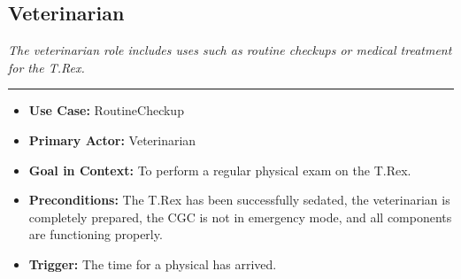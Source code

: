 \documentclass[12pt]{article}
\begin{document}
    \subsection{Veterinarian}
    \textit{The veterinarian role includes uses such as routine checkups or medical treatment for the T.Rex.}
    \par\noindent\rule{\textwidth}{0.4pt}    
    \begin{itemize}
        \item[]\textbf{Use Case:}                                
            RoutineCheckup

        \item[]\textbf{Primary Actor:}
            Veterinarian

        \item[]\textbf{Goal in Context:}
            To perform a regular physical exam on the T.Rex.

        \item[]\textbf{Preconditions:}
            The T.Rex has been successfully sedated, the veterinarian is completely prepared, 
            the CGC is not in emergency mode, and all components are functioning properly.

        \item[]\textbf{Trigger:}
            The time for a physical has arrived.


\end{itemize}
\end{document}

